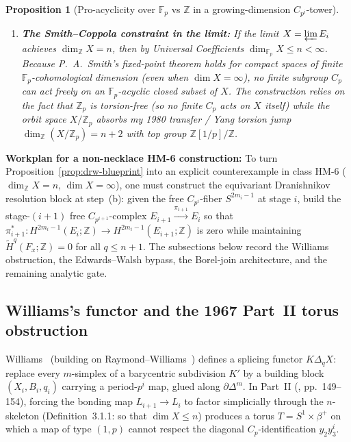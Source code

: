 \documentclass[11pt]{article}
\newtheorem{proposition}[theorem]{Proposition}
\theoremstyle{definition}
\begin{document}
\begin{proposition}[Pro-acyclicity over $\mathbb{F}_p$ vs $\mathbb{Z}$ in a growing-dimension $C_{p^i}$-tower]
\begin{enumerate}[label=(\alph*)]
To obtain $\dim_{\mathbb{Z}}X=n$, stage $i+1$ must instead kill the integral
class in $H^{2m_i-1}(E_i;\mathbb{Z})$ by routing $\pi_{i+1}$ through a higher-dimensional
equivariant Eilenberg--MacLane $K(\mathbb{Z},2m_i-1)$ / Postnikov block of
dimension $d_{i+1}>2m_i-1$ (the Edwards--Walsh / Dranishnikov step).
\item \textbf{The Smith--Coppola constraint in the limit:}
If the limit $X=\varprojlim E_i$ achieves $\dim_{\mathbb{Z}}X=n$, then by
Universal Coefficients $\dim_{\mathbb{F}_p}X\le n<\infty$.  Because P.~A.\
Smith's fixed-point theorem holds for compact spaces of finite
$\mathbb{F}_p$-cohomological dimension (even when $\dim X=\infty$), no
\emph{finite} subgroup $C_p$ can act freely on an $\mathbb{F}_p$-acyclic closed
subset of $X$.  The construction relies on the fact that $\mathbb{Z}_p$ is
\emph{torsion-free} (so no finite $C_p$ acts on $X$ itself) while the orbit
space $X/\mathbb{Z}_p$ absorbs my 1980 transfer / Yang torsion jump
$\dim_{\mathbb{Z}}(X/\mathbb{Z}_p)=n+2$ with top group $\mathbb{Z}[1/p]/\mathbb{Z}$.
\end{enumerate}
\end{proposition}

\begin{checkboxenv}
\textbf{Workplan for a non-necklace HM-6 construction:}
To turn Proposition~\ref{prop:drw-blueprint} into an explicit counterexample in
class HM-6 ($\dim_{\mathbb{Z}}X=n$, $\dim X=\infty$), one must construct the
equivariant Dranishnikov resolution block at step~(b): given the free
$C_{p^i}$-fiber $S^{2m_i-1}$ at stage $i$, build the stage-$(i+1)$ free
$C_{p^{i+1}}$-complex $E_{i+1}\xrightarrow{\pi_{i+1}}E_i$ so that
$\pi_{i+1}^*:H^{2m_i-1}(E_i;\mathbb{Z})\to H^{2m_i-1}(E_{i+1};\mathbb{Z})$ is
zero while maintaining $\tilde{H}^q(F_x;\mathbb{Z})=0$ for all $q\le n+1$.
The subsections below record the Williams obstruction, the Edwards--Walsh
bypass, the Borel-join architecture, and the remaining analytic gate.
\end{checkboxenv}

\subsection{Williams's functor and the 1967 Part~II torus obstruction}
\label{sec:williams-torus}

Williams~\cite{williams1967} (building on Raymond--Williams~\cite{raymondwilliams1960,raymondwilliams1963})
defines a splicing functor $K\Delta_q X$: replace every $m$-simplex of a
barycentric subdivision $K'$ by a building block $(X_i,B_i,q_i)$ carrying a
period-$p^i$ map, glued along $\partial\Delta^m$.  In Part~II
(\cite{williams1967}, pp.~149--154), forcing the bonding map
$L_{i+1}\to L_i$ to factor simplicially through the $n$-skeleton
(Definition~3.1.1: so that $\dim X\le n$) produces a torus
$T=S^1\times\beta^+$ on which a map of type $(1,p)$ cannot respect the
diagonal $C_p$-identification $y_2 y_3^i$.
\end{document}
